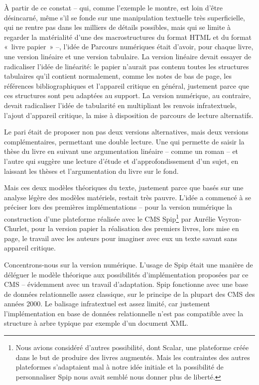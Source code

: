 À partir de ce constat -- qui, comme l'exemple le montre, est loin
d'être désincarné, même s'il se fonde sur une manipulation textuelle
très superficielle, qui ne rentre pas dans les milliers de détails
possibles, mais qui se limite à regarder la matérialité d'une des
macrostructures du format HTML et du format «~livre papier~» --, l'idée
de Parcours numériques était d'avoir, pour chaque livre, une version
linéaire et une version tabulaire. La version linéaire devait essayer de
radicaliser l'idée de linéarité: le papier n'aurait pas contenu toutes
les structures tabulaires qu'il contient normalement, comme les notes de
bas de page, les références bibliographiques et l'appareil critique en
général, justement parce que ces structures sont peu adaptées au
support. La version numérique, au contraire, devait radicaliser l'idée
de tabularité en multipliant les renvois infratextuels, l'ajout
d'appareil critique, la mise à disposition de parcours de lecture
alternatifs.

Le pari était de proposer non pas deux versions alternatives, mais deux
versions complémentaires, permettant une double lecture. Une qui
permette de saisir la thèse du livre en suivant une argumentation
linéaire -- comme un roman -- et l'autre qui suggère une lecture d'étude
et d'approfondissement d'un sujet, en laissant les thèses et
l'argumentation du livre sur le fond.

Mais ces deux modèles théoriques du texte, justement parce que basés sur
une analyse légère des modèles matériels, restait très pauvre. L'idée a
commencé à se préciser lors des premières implémentations -- pour la
version numérique la construction d'une plateforme réalisée avec le CMS
Spip\footnote{Nous avions considéré d'autres possibilité, dont Scalar,
  une plateforme créée dans le but de produire des livres augmentés.
  Mais les contraintes des autres plateformes s'adaptaient mal à notre
  idée initiale et la possibilité de personnaliser Spip nous avait
  semblé nous donner plus de liberté.} par Aurélie Veyron-Churlet, pour
la version papier la réalisation des premiers livres, lors mise en page,
le travail avec les auteurs pour imaginer avec eux un texte savant sans
appareil critique.

Concentrons-nous sur la version numérique. L'usage de Spip était une
manière de déléguer le modèle théorique aux possibilités
d'implémentation proposées par ce CMS -- évidemment avec un travail
d'adaptation. Spip fonctionne avec une base de données relationnelle
assez classique, sur le principe de la plupart des CMS des années 2000.
Le balisage infratextuel est assez limité, car justement
l'implémentation en base de données relationnelle n'est pas compatible
avec la structure à arbre typique par exemple d'un document XML.

